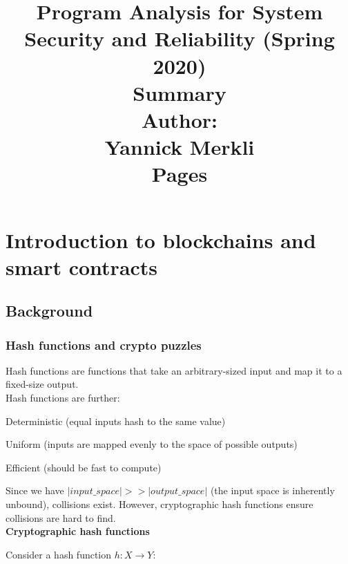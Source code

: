 \documentclass[11pt,oneside,a4paper]{article}
\title{
    \vspace*{0.0mm}
    \LARGE\bf\sf Program Analysis for System Security and Reliability (Spring 2020)
    \vspace*{10.0mm} \\
    \Huge\bf\sf Summary
    \vspace*{30.0mm} \\
    \normalsize
    \sf Author:\\[5pt]
    \sf Yannick Merkli\\ [5pt]
    \sf \pageref{lastpage} Pages
}
\date{}
\begin{document}
\maketitle
\thispagestyle{empty}
\raggedbottom
\clearpage


\clearpage
\setcounter{tocdepth}{2}
\tableofcontents
\clearpage
{}

\setlength\parindent{0pt}
\titlespacing{\subsection}{0pt}{2ex}{2ex}


\newpage

\section{Introduction to blockchains and smart contracts}

\subsection{Background}

\subsubsection{Hash functions and crypto puzzles}

Hash functions are functions that take an arbitrary-sized input and map it to a fixed-size output.\\ Hash functions are further:

\begin{compactitem}
	\item Deterministic (equal inputs hash to the same value)
	\item Uniform (inputs are mapped evenly to the space of possible outputs)
	\item Efficient (should be fast to compute)
\end{compactitem}

Since we have $|input\_space| >> |output\_space|$ (the input space is inherently unbound), collisions exist. However, cryptographic hash functions ensure collisions are hard to find.\\

\textbf{Cryptographic hash functions}

Consider a hash function $h: X \rightarrow Y$:
\end{document}
